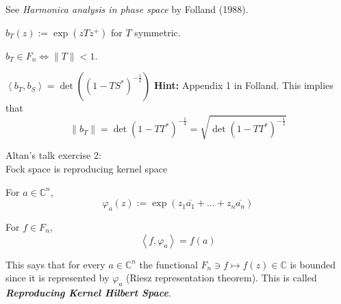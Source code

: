 \begin{remark}\leavevmode
	See \textit{Harmonica analysis in phase space} by Folland (1988).
\end{remark}

\begin{defn}\leavevmode
	$b_T(z):=\operatorname{exp}(zTz^+)$ for $T$ symmetric.
\end{defn}

\begin{claim}\leavevmode
	$b_T\in F_n \iff \|T\|<1$.
\end{claim}

\begin{exercise}\leavevmode
	$\left<b_T,b_S\right> =\det ( (1-TS^*)^{-\frac{1}{2}} )$ \textbf{Hint:} Appendix 1 in Folland. This implies that
	\[\|b_T\|=\det (1-T T^* )^{-\frac{1}{4}}=\sqrt{\det (1-T T^*)^{-\frac{1}{2}}} \]
\end{exercise}
\clearpage

{\Large Altan's talk exercise 2: \\Fock space is reproducing kernel space}

\begin{defn}\leavevmode
	For $a\in \mathbb{C}^{n}$,
	\[\varphi_a(z):=\operatorname{exp}(z_1\overline{a_1}+\ldots +z_n\overline{a_n})\]
\end{defn}

\begin{claim}\leavevmode
	For $f\in F_n$,
	\[\left<f,\varphi_a\right> =f(a)\]
\end{claim}

\begin{remark}\leavevmode
	This says that for every $a\in\mathbb{C}^{n}$ the functional $F_n\ni f\mapsto f(z)\in\mathbb{C}$ is bounded since it is represented by $\varphi_a$ (Riesz representation theorem). This is called \textit{\textbf{Reproducing Kernel Hilbert Space}}.
\end{remark}

